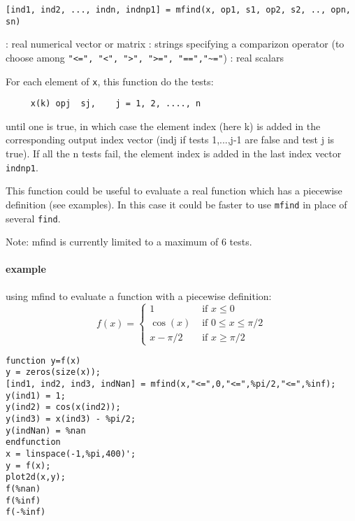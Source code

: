 
\begin{mandesc}
\end{mandesc}

\begin{calling_sequence}
\begin{verbatim}
[ind1, ind2, ..., indn, indnp1] = mfind(x, op1, s1, op2, s2, .., opn, sn)
\end{verbatim}
\end{calling_sequence}
\begin{parameters}
  \begin{varlist}
    :  real numerical vector or matrix
    : strings specifying a comparizon operator (to choose among \verb+"<=", "<", ">", ">=", "==","~="+)
    :  real scalars
  \end{varlist}
\end{parameters}

\begin{mandescription}
For each element of \verb+x+, this function do the tests:
\begin{verbatim}
     x(k) opj  sj,    j = 1, 2, ...., n
\end{verbatim}
until one is true, in which case the element index (here k) is added in the
corresponding output index vector (indj if tests 1,...,j-1 are false and test j is true).
If all the n tests fail, the element index is added in the last index vector \verb+indnp1+.

This function could be useful to evaluate a real function which has a piecewise definition
(see examples). In this case it could be faster to use \verb+mfind+ in place of several \verb+find+.

Note: mfind is currently limited to a maximum of 6 tests.
\end{mandescription}

\begin{examples}
  
\paragraph{example}
using mfind to evaluate a function with a piecewise definition: 
$$
f(x) = \left\{ \begin{array}{ll}
    1     & \mbox{ if } x \le 0 \\
  \cos(x) & \mbox{ if } 0 \le x \le \pi/2 \\
  x-\pi/2 & \mbox{ if } x \ge  \pi/2 
\end{array}\right.
$$
\begin{Verbatim}
function y=f(x) 
y = zeros(size(x)); 
[ind1, ind2, ind3, indNan] = mfind(x,"<=",0,"<=",%pi/2,"<=",%inf); 
y(ind1) = 1; 
y(ind2) = cos(x(ind2)); 
y(ind3) = x(ind3) - %pi/2; 
y(indNan) = %nan 
endfunction 
x = linspace(-1,%pi,400)'; 
y = f(x); 
plot2d(x,y); 
f(%nan) 
f(%inf) 
f(-%inf) 
\end{Verbatim}

 
\end{examples}

